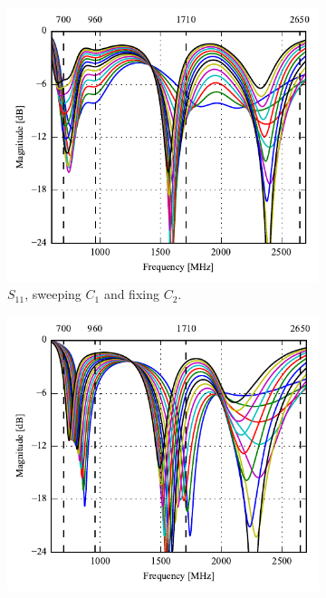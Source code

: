 \begin{figure}[htbp]
    \centering
    \begin{subfigure}{0.49\linewidth}
        \centering
        \includegraphics{img/tech_sol/trianglefeed/Csh1s11.pdf}
        \caption{$S_{11}$, sweeping $C_1$ and fixing $C_2$.}
    \end{subfigure}
    \hfill
    \begin{subfigure}{0.49\linewidth}
        \centering
        \includegraphics{img/tech_sol/trianglefeed/Csh2s22.pdf}

\end{subfigure}
\end{figure}
